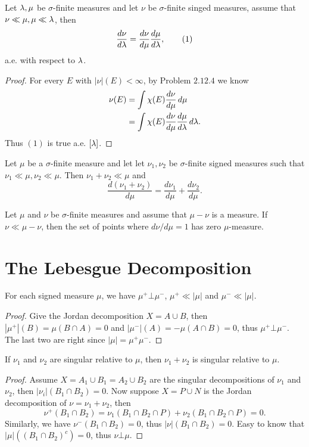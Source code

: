 \begin{pro}%
	Let $\lambda,\mu$ be $\sigma$-finite measures and let $\nu$ be $\sigma$-finite singed measures, assume that $\nu\ll\mu,\mu\ll\lambda$, then
	\[\frac{d\nu}{d\lambda}=\frac{d\nu}{d\mu}\frac{d\mu}{d\lambda},\tag{1}\]
	a.e. with respect to $\lambda$.
\end{pro}
\begin{proof}
	For every $E$ with $|\nu|(E)<\infty$, by Problem $2.12.4$ we know
	\begin{align*}
	\nu(E)&=\int \chi(E) \frac{d\nu}{d\mu}\,d\mu\\
		  &=\int \chi(E) \frac{d\nu}{d\mu}\frac{d\mu}{d\lambda}\,d\lambda.
	\end{align*}
	Thus $(1)$ is true a.e. $[\lambda]$.
\end{proof}

\begin{pro}%
	Let $\mu$ be a $\sigma$-finite measure and let let $\nu_1,\nu_2$ be $\sigma$-finite signed measures such that $\nu_1\ll\mu,\nu_2\ll\mu$. Then $\nu_1+\nu_2\ll\mu$ and
	\[\frac{d(\nu_1+\nu_2)}{d\mu}=\frac{d\nu_1}{d\mu}+\frac{d\nu_2}{d\mu}.\]
\end{pro}

\begin{pro}%
	Let $\mu$ and $\nu$ be $\sigma$-finite measures and assume that $\mu-\nu$ is a measure. If $\nu\ll\mu-\nu$, then the set of points where $d\nu/d\mu=1$ has zero $\mu$-measure.
\end{pro}

\section{The Lebesgue Decomposition}
\begin{pro}%
	For each signed measure $\mu$, we have $\mu^+\bot\mu^-$, $\mu^+\ll|\mu|$ and $\mu^-\ll|\mu|$.
\end{pro}
\begin{proof}
	Give the Jordan decomposition $X=A\cup B$, then $|\mu^+|(B)=\mu(B\cap A)=0$ and $|\mu^-|(A)=-\mu(A\cap B)=0$, thus $\mu^+\bot\mu^-$. The last two are right since $|\mu|=\mu^+\mu^-$.
\end{proof}

\begin{pro}%
	If $\nu_1$ and $\nu_2$ are singular relative to $\mu$, then $\nu_1+\nu_2$ is singular relative to $\mu$.
\end{pro}
\begin{proof}
	Assume $X=A_1\cup B_1=A_2\cup B_2$ are the singular decompositions of $\nu_1$ and $\nu_2$, then $|\nu_i|(B_1\cap B_2)=0$. Now suppose $X=P\cup N$ is the Jordan decomposition of $\nu=\nu_1+\nu_2$, then 
	\[\nu^+(B_1\cap B_2)=\nu_1(B_1\cap B_2\cap P)+\nu_2(B_1\cap B_2\cap P)=0.\]
	Similarly, we have $\nu^-(B_1\cap B_2)=0$, thus $|\nu|(B_1\cap B_2)=0$. Easy to know that $|\mu|((B_1\cap B_2)^c)=0$, thus $\nu\bot\mu$.
\end{proof}

